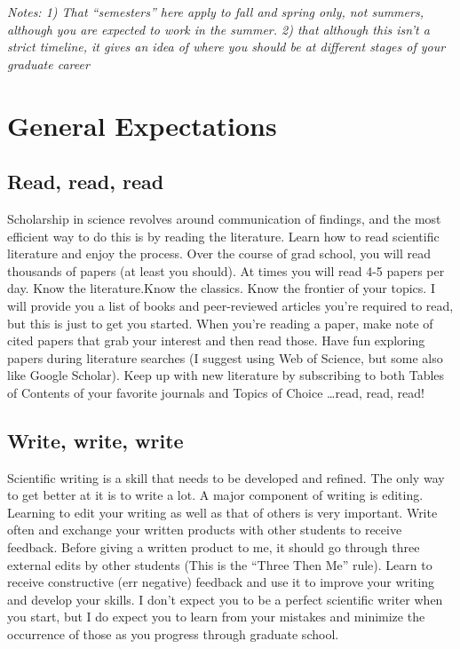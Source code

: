 \documentclass[
]{article}
\begin{document}
\emph{Notes: 1) That ``semesters'' here apply to fall and spring only, not summers, although you are expected to work in the summer. 2) that although this isn't a strict timeline, it gives an idea of where you should be at different stages of your graduate career}

\hypertarget{general-expectations}{%
\section{\texorpdfstring{\textbf{General Expectations}}{General Expectations}}\label{general-expectations}}

\hypertarget{read-read-read}{%
\subsection{Read, read, read}\label{read-read-read}}

Scholarship in science revolves around communication of findings, and the most efficient way to do this is by reading the literature. Learn how to read scientific literature and enjoy the process. Over the course of grad school, you will read thousands of papers (at least you should). At times you will read 4-5 papers per day. Know the literature.Know the classics. Know the frontier of your topics. I will provide you a list of books and peer-reviewed articles you're required to read, but this is just to get you started. When you're reading a paper, make note of cited papers that grab your interest and then read those. Have fun exploring papers during literature searches (I suggest using Web of Science, but some also like Google Scholar). Keep up with new literature by subscribing to both Tables of Contents of your favorite journals and Topics of Choice \ldots read, read, read!

\hypertarget{write-write-write}{%
\subsection{Write, write, write}\label{write-write-write}}

Scientific writing is a skill that needs to be developed and refined. The only way to get better at it is to write a lot. A major component of writing is editing. Learning to edit your writing as well as that of others is very important. Write often and exchange your written products with other students to receive feedback. Before giving a written product to me, it should go through three external edits by other students (This is the ``Three Then Me'' rule). Learn to receive constructive (err negative) feedback and use it to improve your writing and develop your skills. I don't expect you to be a perfect scientific writer when you start, but I do expect you to learn from your mistakes and minimize the occurrence of those as you progress through graduate school.
\end{document}
